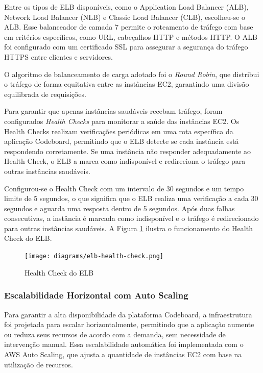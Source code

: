 Entre os tipos de ELB disponíveis, como o Application Load Balancer (ALB), Network Load Balancer (NLB) e Classic Load Balancer (CLB), escolheu-se o ALB. Esse balanceador de camada 7 permite o roteamento de tráfego com base em critérios específicos, como URL, cabeçalhos HTTP e métodos HTTP. O ALB foi configurado com um certificado SSL para assegurar a segurança do tráfego HTTPS entre clientes e servidores.

O algoritmo de balanceamento de carga adotado foi o \emph{Round Robin}, que distribui o tráfego de forma equitativa entre as instâncias EC2, garantindo uma divisão equilibrada de requisições.



Para garantir que apenas instâncias saudáveis recebam tráfego, foram configurados \emph{Health Checks} para monitorar a saúde das instâncias EC2. Os Health Checks realizam verificações periódicas em uma rota específica da aplicação Codeboard, permitindo que o ELB detecte se cada instância está respondendo corretamente. Se uma instância não responder adequadamente ao Health Check, o ELB a marca como indisponível e redireciona o tráfego para outras instâncias saudáveis.

Configurou-se o Health Check com um intervalo de 30 segundos e um tempo limite de 5 segundos, o que significa que o ELB realiza uma verificação a cada 30 segundos e aguarda uma resposta dentro de 5 segundos. Após duas falhas consecutivas, a instância é marcada como indisponível e o tráfego é redirecionado para outras instâncias saudáveis. A Figura \ref{fig:elb-health-check} ilustra o funcionamento do Health Check do ELB.

\begin{figure}[H]
    \centering
    \texttt{[image: diagrams/elb-health-check.png]}
    \caption{Health Check do ELB}
    \label{fig:elb-health-check}
\end{figure}


\subsubsection{Escalabilidade Horizontal com Auto Scaling}

Para garantir a alta disponibilidade da plataforma Codeboard, a infraestrutura foi projetada para escalar horizontalmente, permitindo que a aplicação aumente ou reduza seus recursos de acordo com a demanda, sem necessidade de intervenção manual. Essa escalabilidade automática foi implementada com o AWS Auto Scaling, que ajusta a quantidade de instâncias EC2 com base na utilização de recursos.

